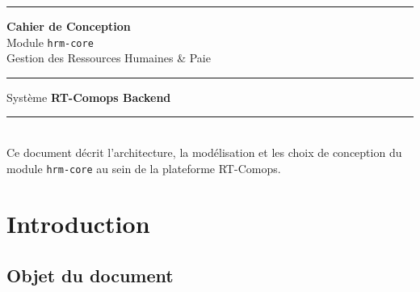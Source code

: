 \documentclass[a4paper,12pt,openany]{book}
\title{}
\author{}
\date{}
\begin{document}
    \begin{titlepage}
        \centering
        \vspace*{2cm}

        {\color{NavyDark}\rule{\textwidth}{2pt}}
        \vspace{0.5cm}

        {\fontsize{28}{34}\selectfont\bfseries\color{NavyDark}
        Cahier de Conception}\\[0.4cm]
        {\fontsize{18}{22}\selectfont\color{GrayDark}
        Module \texttt{hrm-core}}\\[0.2cm]
        {\fontsize{14}{18}\selectfont\color{GrayDark}
        Gestion des Ressources Humaines \& Paie}

        \vspace{0.5cm}
        {\color{GrayMid}\rule{\textwidth}{0.4pt}}

        \vspace{1.5cm}

        {\large\color{GrayDark} Système \textbf{RT-Comops Backend}}\\[0.2cm]


        \vfill

        {\color{GrayMid}\rule{\textwidth}{0.4pt}}\\[0.3cm]
        {\small\color{GrayDark} Ce document décrit l'architecture, la modélisation et les choix de conception du module \texttt{hrm-core} au sein de la plateforme RT-Comops.}
    \end{titlepage}

    \frontmatter
    \tableofcontents
    \listoffigures
    \listoftables
    \clearpage

    \mainmatter


    \chapter{Introduction}

    \section{Objet du document}
\end{document}
